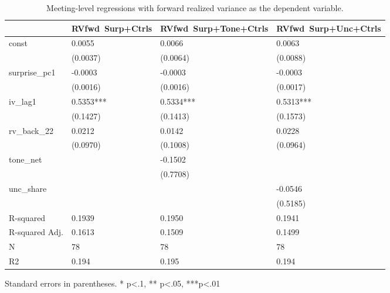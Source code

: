 \begin{table}
\caption{Meeting-level regressions with forward realized variance as the dependent variable.}
\label{tab:meet_rv_controls}
\begin{center}
\begin{tabular}{llll}
\hline
               & RVfwd~Surp+Ctrls & RVfwd~Surp+Tone+Ctrls & RVfwd~Surp+Unc+Ctrls  \\
\hline
const          & 0.0055           & 0.0066                & 0.0063                \\
               & (0.0037)         & (0.0064)              & (0.0088)              \\
surprise\_pc1  & -0.0003          & -0.0003               & -0.0003               \\
               & (0.0016)         & (0.0016)              & (0.0017)              \\
iv\_lag1       & 0.5353***        & 0.5334***             & 0.5313***             \\
               & (0.1427)         & (0.1413)              & (0.1573)              \\
rv\_back\_22   & 0.0212           & 0.0142                & 0.0228                \\
               & (0.0970)         & (0.1008)              & (0.0964)              \\
tone\_net      &                  & -0.1502               &                       \\
               &                  & (0.7708)              &                       \\
unc\_share     &                  &                       & -0.0546               \\
               &                  &                       & (0.5185)              \\
R-squared      & 0.1939           & 0.1950                & 0.1941                \\
R-squared Adj. & 0.1613           & 0.1509                & 0.1499                \\
N              & 78               & 78                    & 78                    \\
R2             & 0.194            & 0.195                 & 0.194                 \\
\hline
\end{tabular}
\end{center}
\end{table}
\bigskip
Standard errors in parentheses. \newline 
* p<.1, ** p<.05, ***p<.01